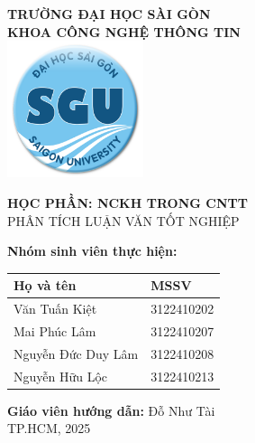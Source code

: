 \centering
{\LARGE \textbf{TRƯỜNG ĐẠI HỌC SÀI GÒN}} \\[0.2cm]
{\Large \textbf{KHOA CÔNG NGHỆ THÔNG TIN}} \\[0.5cm]

\vspace{0.5cm} 
\includegraphics[width=4cm]{./img/logo.png} %
\vspace{0.5cm} %

{\huge \textbf{HỌC PHẦN: NCKH TRONG CNTT}} \\[0.5cm]
{\Large PHÂN TÍCH LUẬN VĂN TỐT NGHIỆP} \\[0.5cm]

\vspace{0.5cm} %

\textbf{Nhóm sinh viên thực hiện:} \\[0.5cm]

\begin{tabular}{|l|l|}
    \hline
    \textbf{Họ và tên} & \textbf{MSSV} \\ \hline
    Văn Tuấn Kiệt & 3122410202 \\ \hline
    Mai Phúc Lâm & 3122410207 \\ \hline
    Nguyễn Đức Duy Lâm & 3122410208 \\ \hline
    Nguyễn Hữu Lộc & 3122410213 \\ \hline
\end{tabular}

\vspace{0.5cm}

\textbf{Giáo viên hướng dẫn:} Đỗ Như Tài \\[0.5cm]

\vfill
{\Large TP.HCM, 2025}